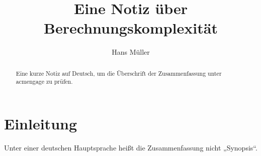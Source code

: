 \documentclass[acmengage,language=german]{acmart}
\begin{document}
\title{Eine Notiz über Berechnungskomplexität}

\author{Hans Müller}

\begin{abstract}
  Eine kurze Notiz auf Deutsch, um die Überschrift der Zusammenfassung unter acmengage zu prüfen.
\end{abstract}


\maketitle

\section{Einleitung}
Unter einer deutschen Hauptsprache heißt die Zusammenfassung nicht „Synopsis“.
\end{document}
